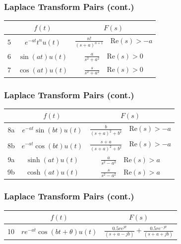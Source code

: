 \documentclass[aspectratio=169,xcolor=dvipsnames,svgnames,x11names,fleqn]{beamer}
\begin{document}
\begin{frame}
\frametitle{Laplace Transform Pairs (cont.)}

\renewcommand{\arraystretch}{2.5} %
\begin{table}
\centering
\begin{tabular}{|c|c|c|}
\hline
& $ f(t) $ & $ F(s) $ \\ \hline
\hline
5 & $ e^{-at}t^n u(t) $ & $ \frac{n!}{(s+a)^{n+1}} \quad \textrm{Re}(s) > -a $ \\ \hline
6 & $ \sin(at)u(t) $ & $ \frac{a}{s^2+a^2}   \quad \textrm{Re}(s) > 0$ \\\hline
7 & $ \cos(at)u(t) $ & $ \frac{s}{s^2+a^2}   \quad \textrm{Re}(s) > 0 $ \\
\hline
\end{tabular}\end{table}
\end{frame}

\begin{frame}
\frametitle{Laplace Transform Pairs (cont.)}

\renewcommand{\arraystretch}{2.5} %
\begin{table}
\centering
\begin{tabular}{|c|c|c|}
\hline
& $ f(t) $ & $ F(s) $ \\
\hline  \hline
8a & $ e^{-at}\sin(bt)u(t) $ & $ \frac{b}{(s+a)^2+b^2}\quad \textrm{Re}(s) > -a  $ \\\hline
8b & $ e^{-at}\cos(bt)u(t) $ & $ \frac{s+a}{(s+a)^2+b^2} \quad \textrm{Re}(s) > -a  $ \\\hline
9a & $ \sinh(at)u(t) $ & $ \frac{a}{s^2-a^2}  \quad \textrm{Re}(s) > a $ \\\hline
9b & $ \cosh(at)u(t) $ & $ \frac{s}{s^2-a^2}  \quad \textrm{Re}(s) > a $ \\
\hline
\end{tabular}\end{table}
\end{frame}

\begin{frame}
\frametitle{Laplace Transform Pairs (cont.)}

\renewcommand{\arraystretch}{2.5} %
\begin{table}
\centering
\begin{tabular}{|c|c|c|}
\hline
 & $ f(t) $ & $ F(s) $ \\
\hline \hline
10 & $ r e^{-at}\cos(bt+\theta)u(t) $ & $ \frac{0.5r e^{j\theta}}{(s+a - jb)} + \frac{0.5r e^{-j\theta}}{(s+a + jb)} $ \\
\hline
\end{tabular}\end{table}
\end{frame}
\end{document}
